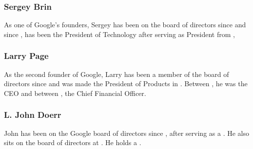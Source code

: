 \documentclass[a4paper,12pt]{article}
\begin{document}
\subsubsection{Sergey Brin}

As one of Google's founders, Sergey has been on the board of directors 
since \cite[September 1998]{board} and since \cite[July 2001]{board},
has been the President of Technology after serving as President from 
\cite[September 1998 to July 2001]{board}, \cite[Sergey holds a Masters 
degree in computer science from Stanford University, a Bachelor of 
Science degree with high honours in mathematics and computer science 
from the University of Maryland at College Park and is currently on 
leave from the Ph.D. program in computer science at Stanford 
University.]{board}

\subsubsection{Larry Page}

As the second founder of Google, Larry has been a member of the board of
directors since \cite[September 1998]{board} and was made the President of
Products in \cite[July 2001]{board}. Between \cite[September 1998 to 
July 2001]{board}, he was the CEO and between \cite[September 1998 to 
July 2002]{board}, the Chief Financial Officer. \cite[Larry holds a 
Masters degree in computer science from Stanford University, a Bachelor 
of Science degree with high honours in engineering, with a concentration 
in computer engineering, from the University of Michigan and is 
currently on leave from the Ph.D. program in computer science at 
Stanford University.]{board}

\subsubsection{L. John Doerr} 

John has been on the Google board of directors since \cite[May
1999]{board}, after serving as a \cite[General Partner of Kleiner 
Perkins Caufield and Byers, since August 1980]{board}. He also 
sits on the board of directors at 
\cite[Amazon.com, drugstore.com, Homestore.com, Intuit, 
PalmOne, and Sun Microsystems]{board}. He holds a \cite[Masters of 
Business Administration degree from Harvard Business School and a 
Masters of Science degree in electrical engineering and computer 
science and a Bachelor of Science degree in electrical engineering 
from Rice University]{board}.
\end{document}
